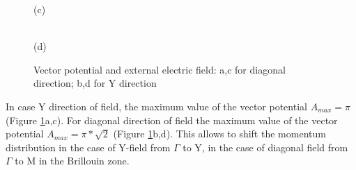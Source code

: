 \begin{figure}[h!]
\begin{minipage}[h]{0.5\linewidth}
 (c) \\
\end{minipage}
\hfill
\begin{minipage}[h]{0.5\linewidth}
 \\(d)
\end{minipage}

\caption{Vector potential and external electric field: a,c for diagonal direction; b,d for Y direction}
\label{fig:Pulses}
\end{figure}


In case Y direction of field, the maximum value of the vector potential $A_{max} = \pi$ (Figure \ref{fig:Pulses}a,c). For diagonal direction of field the maximum value of the vector potential $A_{max} =\pi*\sqrt{2}$ (Figure \ref{fig:Pulses}b,d). This allows to shift the momentum distribution in the case of Y-field from $\Gamma$ to Y, in the case of diagonal field from $\Gamma$ to M in the Brillouin zone.

